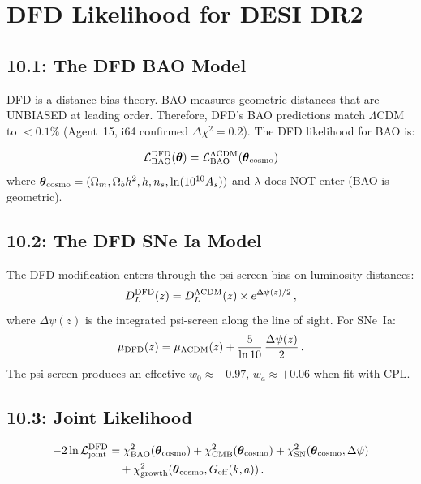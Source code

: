 \documentclass[11pt,a4paper]{article}
\begin{document}
\section{DFD Likelihood for DESI DR2}

\subsection{10.1: The DFD BAO Model}

DFD is a distance-bias theory. BAO measures geometric distances that are UNBIASED at leading order. Therefore, DFD's BAO predictions match $\Lambda$CDM to $< 0.1\%$ (Agent~15, i64 confirmed $\Delta\chi^2 = 0.2$). The DFD likelihood for BAO is:

\begin{equation}
\mathcal{L}_{\rm BAO}^{\rm DFD}(\boldsymbol{\theta}) = \mathcal{L}_{\rm BAO}^{\Lambda\text{CDM}}(\boldsymbol{\theta}_{\rm cosmo})
\end{equation}
where $\boldsymbol{\theta}_{\rm cosmo} = (\Omega_m, \Omega_b h^2, h, n_s, \ln(10^{10}A_s))$ and $\lambda$ does NOT enter (BAO is geometric).

\subsection{10.2: The DFD SNe Ia Model}

The DFD modification enters through the psi-screen bias on luminosity distances:
\begin{equation}
D_L^{\rm DFD}(z) = D_L^{\Lambda\text{CDM}}(z) \times e^{\Delta\psi(z)/2}\,,
\end{equation}
where $\Delta\psi(z)$ is the integrated psi-screen along the line of sight. For SNe~Ia:
\begin{equation}
\mu_{\rm DFD}(z) = \mu_{\Lambda\text{CDM}}(z) + \frac{5}{\ln 10}\,\frac{\Delta\psi(z)}{2}\,.
\end{equation}
The psi-screen produces an effective $w_0 \approx -0.97$, $w_a \approx +0.06$ when fit with CPL.

\subsection{10.3: Joint Likelihood}

\begin{align}
-2\ln\mathcal{L}_{\rm joint}^{\rm DFD} &= \chi^2_{\rm BAO}(\boldsymbol{\theta}_{\rm cosmo}) + \chi^2_{\rm CMB}(\boldsymbol{\theta}_{\rm cosmo}) + \chi^2_{\rm SN}(\boldsymbol{\theta}_{\rm cosmo}, \Delta\psi) \nonumber\\
&\quad + \chi^2_{\rm growth}(\boldsymbol{\theta}_{\rm cosmo}, G_{\rm eff}(k,a))\,.
\end{align}
\end{document}
